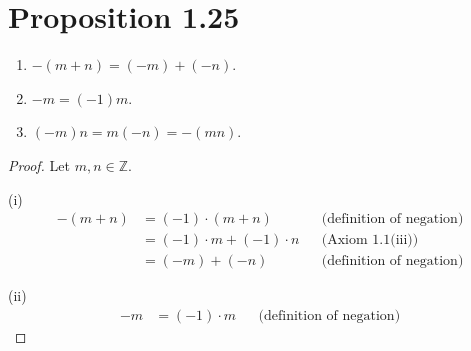 \section*{Proposition 1.25}
\begin{enumerate}[label=(\roman*)]
    \item $-(m+n) = (-m) + (-n)$.
    \item $-m = (-1)m$.
    \item $(-m)n = m(-n) = -(mn)$.
\end{enumerate}
\begin{proof}
    Let $m, n \in \mathbb{Z}$.

    (i)
    \begin{align*}
        -(m+n) & = (-1) \cdot (m+n)            &  & \text{(definition of negation)} \\
               & = (-1) \cdot m + (-1) \cdot n &  & \text{(Axiom 1.1(iii))}         \\
               & = (-m) + (-n)                 &  & \text{(definition of negation)}
    \end{align*}

    (ii)
    \begin{align*}
        -m & = (-1) \cdot m &  & \text{(definition of negation)}
    \end{align*}


\end{proof}
